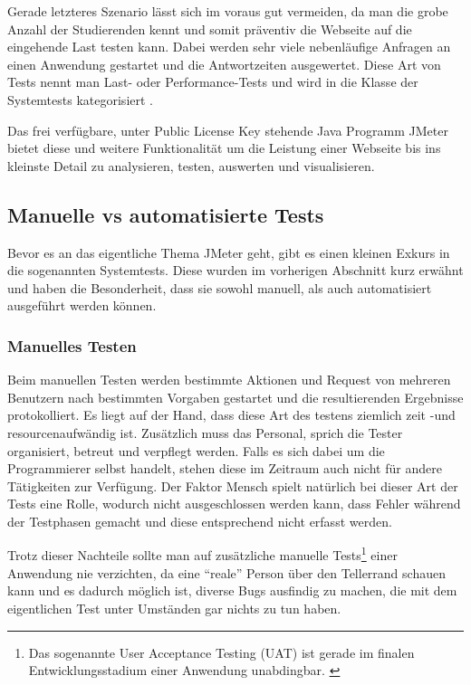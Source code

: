 \documentclass[a4paper,12pt]{article}
\begin{document}
Gerade letzteres Szenario lässt sich im voraus gut vermeiden, da man die grobe Anzahl der Studierenden kennt und somit präventiv die Webseite auf die eingehende Last testen kann. Dabei werden sehr viele nebenläufige Anfragen an einen Anwendung gestartet und die Antwortzeiten ausgewertet. Diese Art von Tests nennt man Last- oder Performance-Tests und wird in die Klasse der Systemtests kategorisiert \cite{online:LastUndPerformanceTest}. 

Das frei verfügbare, unter Public License Key stehende Java Programm JMeter bietet diese und weitere Funktionalität um die Leistung einer Webseite bis ins kleinste Detail zu analysieren, testen, auswerten und visualisieren.

\subsection{Manuelle vs automatisierte Tests}
Bevor es an das eigentliche Thema JMeter geht, gibt es einen kleinen Exkurs in die sogenannten Systemtests. Diese wurden im vorherigen Abschnitt kurz erwähnt und haben die Besonderheit, dass sie sowohl manuell, als auch automatisiert ausgeführt werden können. 

\subsubsection{Manuelles Testen}
Beim manuellen Testen werden bestimmte Aktionen und Request von mehreren Benutzern nach bestimmten Vorgaben gestartet und die resultierenden Ergebnisse protokolliert. Es liegt auf der Hand, dass diese Art des testens ziemlich zeit -und resourcenaufwändig ist. Zusätzlich muss das Personal, sprich die Tester organisiert, betreut und verpflegt werden. Falls es sich dabei um die Programmierer selbst handelt, stehen diese im Zeitraum auch nicht für andere Tätigkeiten zur Verfügung. Der Faktor Mensch spielt natürlich bei dieser Art der Tests eine Rolle, wodurch nicht ausgeschlossen werden kann, dass Fehler während der Testphasen gemacht und diese entsprechend nicht erfasst werden. \cite[S. 11]{book:ApacheJMeter}

Trotz dieser Nachteile sollte man auf zusätzliche manuelle Tests\footnote{Das sogenannte User Acceptance Testing (UAT) ist gerade im finalen Entwicklungsstadium einer Anwendung unabdingbar. \cite{online:wikiUAT}} einer Anwendung nie verzichten, da eine "`reale"' Person über den Tellerrand schauen kann und es dadurch möglich ist, diverse Bugs ausfindig zu machen, die mit dem eigentlichen Test unter Umständen gar nichts zu tun haben.
\end{document}
